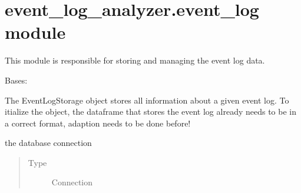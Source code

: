 \documentclass[letterpaper,10pt,english]{sphinxmanual}
\begin{document}
\section{event\_log\_analyzer.event\_log module}
\label{\detokenize{event_log_analyzer:module-event_log_analyzer.event_log}}\label{\detokenize{event_log_analyzer:event-log-analyzer-event-log-module}}
\sphinxAtStartPar
This module is responsible for storing and managing the event log data.

\begin{fulllineitems}
\label{\detokenize{event_log_analyzer:event_log_analyzer.event_log.EventLogStorage}}
\sphinxAtStartPar
Bases: 

\sphinxAtStartPar
The EventLogStorage object stores all information about a given event log. To itialize the object, the dataframe that stores the event log already needs to be in a correct format, adaption needs to be done before!

\begin{fulllineitems}
\label{\detokenize{event_log_analyzer:event_log_analyzer.event_log.EventLogStorage._con}}
\sphinxAtStartPar
the database connection
\begin{quote}\begin{description}
\item[{Type}] \leavevmode
\sphinxAtStartPar
Connection

\end{description}\end{quote}

\end{fulllineitems}



\end{fulllineitems}
\end{document}
